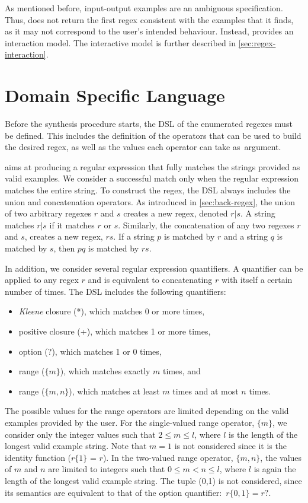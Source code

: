As mentioned before, input-output examples are an ambiguous specification. Thus, \Forest{} does not return the first regex consistent with the examples that it finds, as it may not correspond to the user's intended behaviour. Instead, \Forest{} provides an interaction model. The interactive model is further described in \autoref{sec:regex-interaction}. 


\section{Domain Specific Language}\label{sec:dsl}
Before the synthesis procedure starts, the \ac{DSL} of the enumerated regexes must be defined. This includes the definition of the operators that can be used to build the desired regex, as well as the values each operator can take as~argument. 

\Forest{} aims at producing a regular expression that fully  matches the strings provided as valid examples. We consider a successful match only when the regular expression matches the entire string.
%
To construct the regex, the \ac{DSL} always includes the union %
and concatenation operators. As introduced in \autoref{sec:back-regex}, the union of two arbitrary regexes \(r\) and \(s\) creates a new regex, denoted \(r|s\). A string matches \(r|s\) if it matches \(r\) or \(s\). Similarly, the concatenation of any two regexes \(r\) and \(s\), creates a new regex, \(rs\). If a string \(p\) is matched by \(r\) and a string \(q\) is matched by \(s\), then \(pq\) is matched by \(rs\).

In addition, we consider several regular expression quantifiers. A quantifier can be applied to any regex \(r\) and is equivalent to concatenating \(r\) with itself a certain number of times. The \ac{DSL} includes the following quantifiers:
\begin{itemize}
    \item \textit{Kleene} closure (*), which matches 0 or more times,
    \item positive closure (+), which matches 1 or more times,
    \item option (?), which matches 1 or 0 times,
    \item range (\(\{m\}\)), which matches exactly \(m\) times, and
    \item range (\(\{m,n\}\)), which matches at least \(m\) times and at most \(n\) times.
\end{itemize}

\noindent
The possible values for the range operators are limited depending on the valid examples provided by the user. For the single-valued range operator, \(\{m\}\), we consider only the integer values such that \(2 \le m \le l\), where \(l\) is the length of the longest valid example string. Note that \(m = 1\) is not considered since it is the identity function (\(r\)\(\{1\}\) = \(r\)).
In the two-valued range operator, \(\{m,n\}\), the values of \(m\) and \(n\) are limited to integers such that \(0 \le m < n \leq l\), where \(l\) is again the length of the longest valid example string. The tuple (0,1) is not considered, since its semantics are equivalent to that of the option quantifier:~\(r\{0,1\} = r?\).


